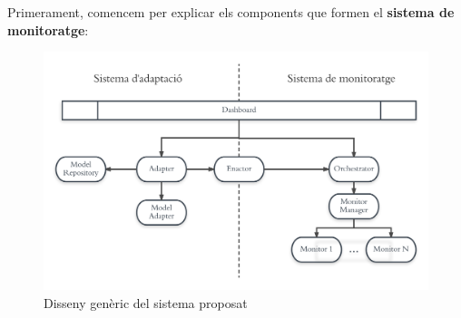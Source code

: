 Primerament, comencem per explicar els components que formen el \textbf{sistema de monitoratge}:

\begin{figure}
\centering
\includegraphics[width=13cm]{Figures/Figure4}
\decoRule
\caption[Disseny genèric del sistema proposat]{Disseny genèric del sistema proposat}
\label{fig:Figura4}
\end{figure}

